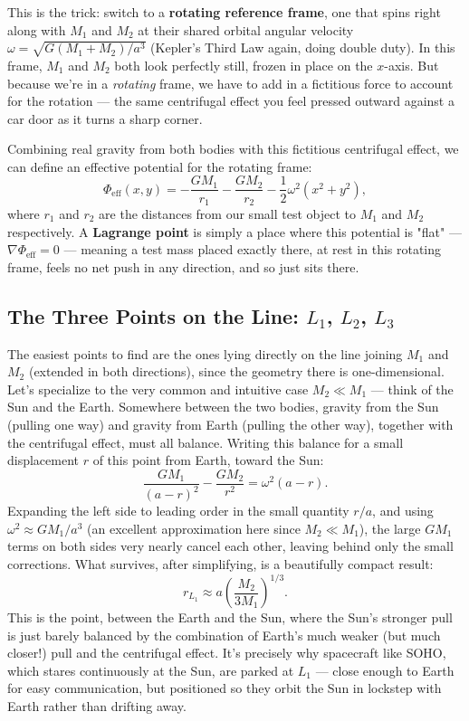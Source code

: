 \documentclass[11pt]{article}
\begin{document}
This is the trick: switch to a \textbf{rotating reference frame}, one that spins right along with
$M_1$ and $M_2$ at their shared orbital angular velocity $\omega=\sqrt{G(M_1+M_2)/a^3}$ (Kepler's
Third Law again, doing double duty). In this frame, $M_1$ and $M_2$ both look perfectly still,
frozen in place on the $x$-axis. But because we're in a \emph{rotating} frame, we have to add in a
fictitious force to account for the rotation --- the same centrifugal effect you feel pressed
outward against a car door as it turns a sharp corner.

Combining real gravity from both bodies with this fictitious centrifugal effect, we can define an
effective potential for the rotating frame:
\[
\Phi_{\text{eff}}(x,y) = -\frac{GM_1}{r_1}-\frac{GM_2}{r_2}-\frac12\omega^2(x^2+y^2),
\]
where $r_1$ and $r_2$ are the distances from our small test object to $M_1$ and $M_2$
respectively. A \textbf{Lagrange point} is simply a place where this potential is "flat" ---
$\nabla\Phi_{\text{eff}}=0$ --- meaning a test mass placed exactly there, at rest in this rotating
frame, feels no net push in any direction, and so just sits there.

\subsection*{The Three Points on the Line: $L_1$, $L_2$, $L_3$}

The easiest points to find are the ones lying directly on the line joining $M_1$ and $M_2$
(extended in both directions), since the geometry there is one-dimensional. Let's specialize to the
very common and intuitive case $M_2\ll M_1$ --- think of the Sun and the Earth. Somewhere between
the two bodies, gravity from the Sun (pulling one way) and gravity from Earth (pulling the other
way), together with the centrifugal effect, must all balance. Writing this balance for a small
displacement $r$ of this point from Earth, toward the Sun:
\[
\frac{GM_1}{(a-r)^2} - \frac{GM_2}{r^2} = \omega^2(a-r).
\]
Expanding the left side to leading order in the small quantity $r/a$, and using
$\omega^2\approx GM_1/a^3$ (an excellent approximation here since $M_2\ll M_1$), the large $GM_1$
terms on both sides very nearly cancel each other, leaving behind only the small corrections. What
survives, after simplifying, is a beautifully compact result:
\[
\boxed{r_{L_1} \approx a\left(\frac{M_2}{3M_1}\right)^{1/3}.}
\]
This is the point, between the Earth and the Sun, where the Sun's stronger pull is just barely
balanced by the combination of Earth's much weaker (but much closer!) pull and the centrifugal
effect. It's precisely why spacecraft like SOHO, which stares continuously at the Sun, are parked
at $L_1$ --- close enough to Earth for easy communication, but positioned so they orbit the Sun in
lockstep with Earth rather than drifting away.
\end{document}
